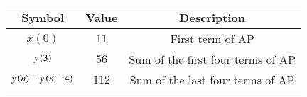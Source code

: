 \footnotesize
\begin{tabular}{|c|c|c|}
\hline
Symbol & Value & Description\\
\hline
$x(0)$ & $11$ & First term of AP \\
\hline
$y\left(3\right)$ & $56$ & Sum of the first four terms of AP\\
\hline
$y\left(n\right)-y\left(n-4\right)$ & $112$& Sum of the last four terms of AP\\
\hline
\end{tabular}
